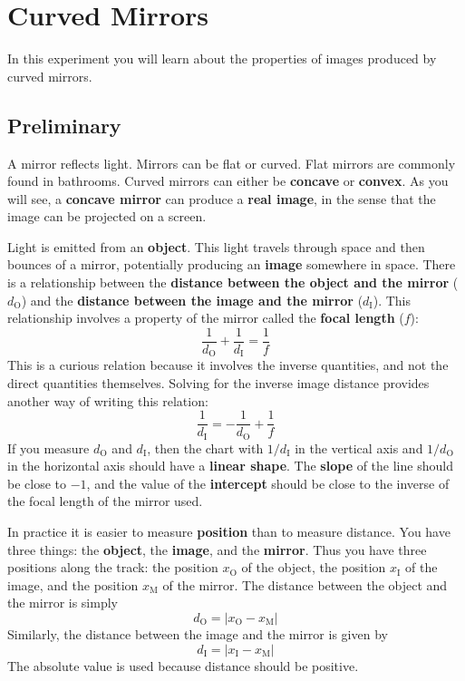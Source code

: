\setcounter{chapter}{6}
\chapter{Curved Mirrors}
%
In this experiment you will learn about the properties of images produced by curved mirrors.
%
\section{Preliminary}
%
A mirror reflects light. Mirrors can be flat or curved. Flat mirrors are commonly found in bathrooms. Curved mirrors can either be \textbf{concave} or \textbf{convex}. As you will see, a \textbf{concave mirror} can produce a \textbf{real image}, in the sense that the image can be projected on a screen.

Light is emitted from an \textbf{object}. This light travels through space and then bounces of a mirror, potentially producing an \textbf{image} somewhere in space. There is a relationship between the \textbf{distance between the object and the mirror} ($d_{\text{O}}$) and the \textbf{distance between the image and the mirror} ($d_{\text{I}}$). This relationship involves a property of the mirror called the \textbf{focal length} ($f$):
\begin{equation}
    \frac{1}{d_{\text{O}}} + \frac{1}{d_{\text{I}}} = \frac{1}{f}
\end{equation}
This is a curious relation because it involves the inverse quantities, and not the direct quantities themselves. Solving for the inverse image distance provides another way of writing this relation:
\begin{equation}
    \frac{1}{d_{\text{I}}} = -\frac{1}{d_{\text{O}}} + \frac{1}{f}
\end{equation}
If you measure $d_{\text{O}}$ and $d_{\text{I}}$, then the chart with $1/d_{\text{I}}$ in the vertical axis and $1/d_{\text{O}}$ in the horizontal axis should have a \textbf{linear shape}. The \textbf{slope} of the line should be close to $-1$, and the value of the \textbf{intercept} should be close to the inverse of the focal length of the mirror used.

In practice it is easier to measure \textbf{position} than to measure distance. You have three things: the \textbf{object}, the \textbf{image}, and the \textbf{mirror}. Thus you have three positions along the track: the position $x_{\text{O}}$ of the object, the position $x_{\text{I}}$ of the image, and the position $x_{\text{M}}$ of the mirror. The distance between the object and the mirror is simply
\begin{equation}
    d_{\text{O}} = \left\vert x_{\text{O}} - x_{\text{M}} \right\vert
\end{equation}
Similarly, the distance between the image and the mirror is given by
\begin{equation}
    d_{\text{I}} = \left\vert x_{\text{I}} - x_{\text{M}} \right\vert
\end{equation}
The absolute value is used because distance should be positive.
%
